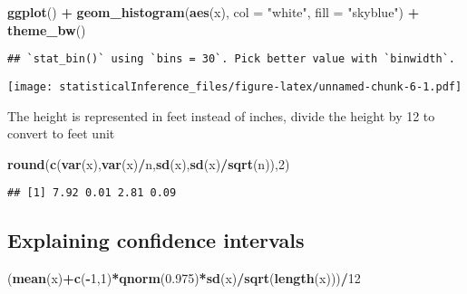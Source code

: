 \documentclass[
]{article}
\newenvironment{Shaded}{\begin{snugshade}}{\end{snugshade}}
\newcommand{\DataTypeTok}[1]{\textcolor[rgb]{0.13,0.29,0.53}{#1}}
\newcommand{\DecValTok}[1]{\textcolor[rgb]{0.00,0.00,0.81}{#1}}
\newcommand{\FloatTok}[1]{\textcolor[rgb]{0.00,0.00,0.81}{#1}}
\newcommand{\KeywordTok}[1]{\textcolor[rgb]{0.13,0.29,0.53}{\textbf{#1}}}
\newcommand{\NormalTok}[1]{#1}
\newcommand{\OperatorTok}[1]{\textcolor[rgb]{0.81,0.36,0.00}{\textbf{#1}}}
\newcommand{\StringTok}[1]{\textcolor[rgb]{0.31,0.60,0.02}{#1}}
\begin{document}
\begin{Shaded}
\begin{Highlighting}[]
\KeywordTok{ggplot}\NormalTok{() }\OperatorTok{+}\StringTok{ }\KeywordTok{geom_histogram}\NormalTok{(}\KeywordTok{aes}\NormalTok{(x), }\DataTypeTok{col =} \StringTok{"white"}\NormalTok{, }\DataTypeTok{fill =} \StringTok{"skyblue"}\NormalTok{) }\OperatorTok{+}\StringTok{ }\KeywordTok{theme_bw}\NormalTok{()}
\end{Highlighting}
\end{Shaded}

\begin{verbatim}
## `stat_bin()` using `bins = 30`. Pick better value with `binwidth`.
\end{verbatim}

\texttt{[image: statisticalInference\_files/figure-latex/unnamed-chunk-6-1.pdf]}

The height is represented in feet instead of inches, divide the height
by 12 to convert to feet unit

\begin{Shaded}
\begin{Highlighting}[]
\KeywordTok{round}\NormalTok{(}\KeywordTok{c}\NormalTok{(}\KeywordTok{var}\NormalTok{(x),}\KeywordTok{var}\NormalTok{(x)}\OperatorTok{/}\NormalTok{n,}\KeywordTok{sd}\NormalTok{(x),}\KeywordTok{sd}\NormalTok{(x)}\OperatorTok{/}\KeywordTok{sqrt}\NormalTok{(n)),}\DecValTok{2}\NormalTok{)}
\end{Highlighting}
\end{Shaded}

\begin{verbatim}
## [1] 7.92 0.01 2.81 0.09
\end{verbatim}

\hypertarget{explaining-confidence-intervals}{%
\subsection{Explaining confidence
intervals}\label{explaining-confidence-intervals}}

\begin{Shaded}
\begin{Highlighting}[]
\NormalTok{(}\KeywordTok{mean}\NormalTok{(x)}\OperatorTok{+}\KeywordTok{c}\NormalTok{(}\OperatorTok{-}\DecValTok{1}\NormalTok{,}\DecValTok{1}\NormalTok{)}\OperatorTok{*}\KeywordTok{qnorm}\NormalTok{(}\FloatTok{0.975}\NormalTok{)}\OperatorTok{*}\KeywordTok{sd}\NormalTok{(x)}\OperatorTok{/}\KeywordTok{sqrt}\NormalTok{(}\KeywordTok{length}\NormalTok{(x)))}\OperatorTok{/}\DecValTok{12}
\end{Highlighting}
\end{Shaded}
\end{document}
